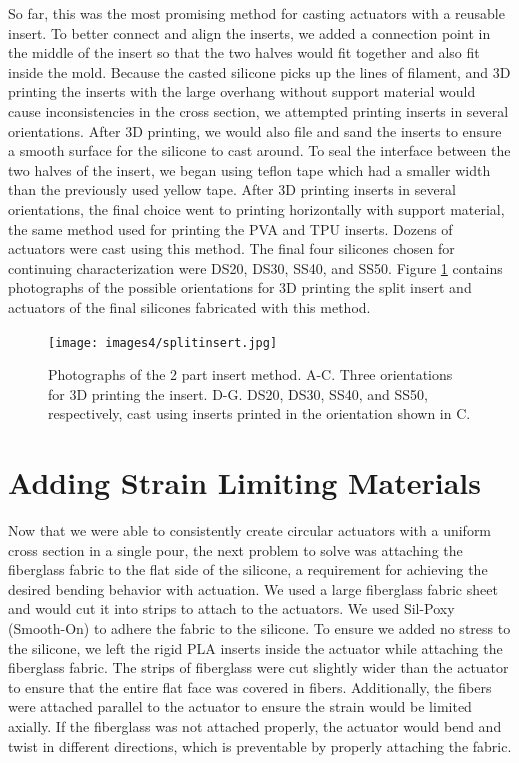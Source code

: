 So far, this was the most promising method for casting actuators with a reusable insert. To better connect and align the inserts, we added a connection point in the middle of the insert so that the two halves would fit together and also fit inside the mold. Because the casted silicone picks up the lines of filament, and 3D printing the inserts with the large overhang without support material would cause inconsistencies in the cross section, we attempted printing inserts in several orientations. After 3D printing, we would also file and sand the inserts to ensure a smooth surface for the silicone to cast around. To seal the interface between the two halves of the insert, we began using teflon tape which had a smaller width than the previously used yellow tape. After 3D printing inserts in several orientations, the final choice went to printing horizontally with support material, the same method used for printing the PVA and TPU inserts. Dozens of actuators were cast using this method. The final four silicones chosen for continuing characterization were DS20, DS30, SS40, and SS50. Figure \ref{fig:splitinsert} contains photographs of the possible orientations for 3D printing the split insert and actuators of the final silicones fabricated with this method. 

\begin{figure}[h!]
    \centering
    \texttt{[image: images4/splitinsert.jpg]}
    \caption{Photographs of the 2 part insert method. A-C. Three orientations for 3D printing the insert. D-G. DS20, DS30, SS40, and SS50, respectively, cast using inserts printed in the orientation shown in C.}
    \label{fig:splitinsert}
\end{figure}

\section{Adding Strain Limiting Materials}
Now that we were able to consistently create circular actuators with a uniform cross section in a single pour, the next problem to solve was attaching the fiberglass fabric to the flat side of the silicone, a requirement for achieving the desired bending behavior with actuation. We used a large fiberglass fabric sheet and would cut it into strips to attach to the actuators. We used Sil-Poxy (Smooth-On) to adhere the fabric to the silicone. To ensure we added no stress to the silicone, we left the rigid PLA inserts inside the actuator while attaching the fiberglass fabric. The strips of fiberglass were cut slightly wider than the actuator to ensure that the entire flat face was covered in fibers. Additionally, the fibers were attached parallel to the actuator to ensure the strain would be limited axially. If the fiberglass was not attached properly, the actuator would bend and twist in different directions, which is preventable by properly attaching the fabric. 

